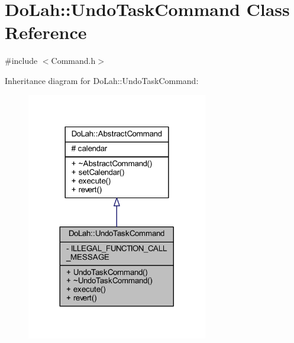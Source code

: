 \hypertarget{class_do_lah_1_1_undo_task_command}{}\section{Do\+Lah\+:\+:Undo\+Task\+Command Class Reference}
\label{class_do_lah_1_1_undo_task_command}


{\ttfamily \#include $<$Command.\+h$>$}



Inheritance diagram for Do\+Lah\+:\+:Undo\+Task\+Command\+:\nopagebreak
\begin{figure}[H]
\begin{center}
\leavevmode
\includegraphics[width=224pt]{class_do_lah_1_1_undo_task_command__inherit__graph}
\end{center}
\end{figure}


